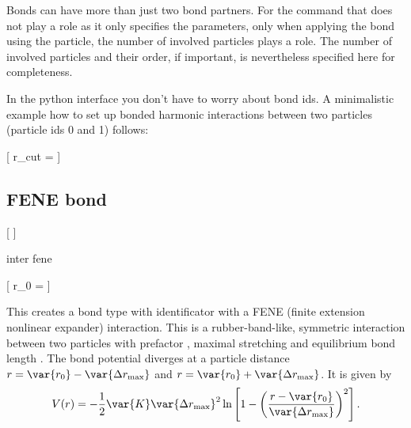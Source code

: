 Bonds can have more than just two bond partners. For the  command
that does not play a role as it only specifies the parameters, only when
applying the bond using the  particle, the number of involved
particles plays a role. The number of involved particles and their order, if
important, is nevertheless specified here for completeness.

In the python interface you don't have to worry about bond ids.
A minimalistic example how to set up bonded harmonic interactions between two particles (particle ids 0 and 1) follows:

\begin{pysyntax}
  [
    r_cut = 
  ]
\end{pysyntax}

\subsection{FENE bond}

\begin{pysyntax}
  [
  ]
\end{pysyntax}

\begin{essyntax}
  inter 
  fene
    
\end{essyntax}
\begin{pysyntax}
 [
    r_0 = 
  ]
\end{pysyntax}

This creates a bond type with identificator  with a
FENE (finite extension nonlinear expander) interaction. This is a
rubber-band-like, symmetric interaction between two particles with
prefactor , maximal stretching  and
equilibrium bond length .  The bond potential diverges at a
particle distance $r=\var{r_0}-\var{\Delta r_\mathrm{max}}$ and
$r=\var{r_0}+\var{\Delta r_\mathrm{max}}$. It is given by
\begin{equation}
  V(r) = -\frac{1}{2} \var{K} \var{\Delta r_\mathrm{max}}^2\ln \left[ 1 - \left(
      \frac{r-\var{r_0}}{\var{\Delta r_\mathrm{max}}} \right)^2 \right].
\end{equation}

